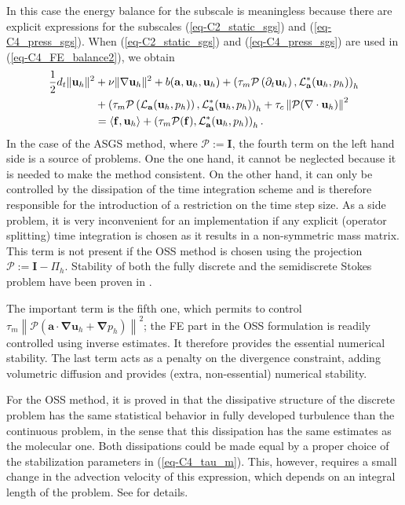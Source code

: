 In this case the energy balance for the subscale is meaningless because there are explicit expressions for the subscales (\ref{eq-C2_static_sgs}) and (\ref{eq-C4_press_sgs}). When (\ref{eq-C2_static_sgs}) and (\ref{eq-C4_press_sgs}) are used in (\ref{eq-C4_FE_balance2}), we obtain
\begin{align}
\label{eq-C4_static_energy}
\frac{1}{2}d_t\|{\bf u}_h\|^2
& +\nu\|\nabla{\bf u}_h\|^2 + b({\bf a},{\bf u}_h,{\bf u}_h)  
  + \left( \tau_{m} \mathcal{P} \left(  \partial_t {\bf u}_h \right), \mathcal{L}^*_{{\bf a}} ( {\bf u}_{h},p_h)\right)_h \\ \nonumber
& + \left(\tau_{m} \mathcal{P} \left( \mathcal{L}_{{\bf a}} ( {\bf u}_{h},p_h) \right),\mathcal{L}^*_{{\bf a}}({\bf u}_h,p_h)\right)_h
+ \tau_{c} \left\| \mathcal{P}(\nabla \cdot {\bf u}_{h})\right\|^{2}\\ \nonumber
& = \langle\mathbf{f},\mathbf{u}_h\rangle + \left(\tau_m \mathcal{P}(\mathbf{f}),\mathcal{L}^*_{{\bf a}}({\bf u}_h,p_h)\right)_h.
\end{align}
In the case of the ASGS method, where $\mathcal{P}:=\mathbf{I}$, the fourth term on the left hand side is a source of problems. One the one hand, it cannot be neglected because it is needed to make the method consistent. On the other hand, it can only be controlled by the dissipation of the time integration scheme and is therefore responsible for the introduction of a restriction on the time step size. As a side problem, it is very inconvenient for an implementation if any explicit (operator splitting) time integration is chosen as it results in a non-symmetric mass matrix. This term is not present if the OSS method is chosen using the projection $\mathcal{P}:=\mathbf{I}-\Pi_h$. Stability of both the fully discrete and the semidiscrete Stokes problem have been proven in \cite{Badia2009a}.

The important term is the fifth one, which permits to control
$ \tau_{m} \left\| \mathcal{P} \left( \mathbf{a}\cdot \mathbf{\nabla u}_{h}+\mathbf{\nabla }p_{h}\right) \right\|^{2} $; the FE part in the OSS formulation is readily controlled using inverse estimates. It therefore provides the essential numerical stability. The last term acts as a penalty on the divergence constraint, adding volumetric diffusion and provides (extra, non-essential) numerical stability.

For the OSS method, it is proved in \cite{guasch-codina-13} that the dissipative structure of the discrete problem has the same statistical behavior in fully developed turbulence than the continuous problem, in the sense that this dissipation has the same estimates as the molecular one. Both dissipations could be made equal by a proper choice of the stabilization parameters in (\ref{eq-C4_tau_m}). This, however, requires a small change in the advection velocity of this expression, which depends on an integral length of the problem. See \cite{guasch-codina-13} for details.

